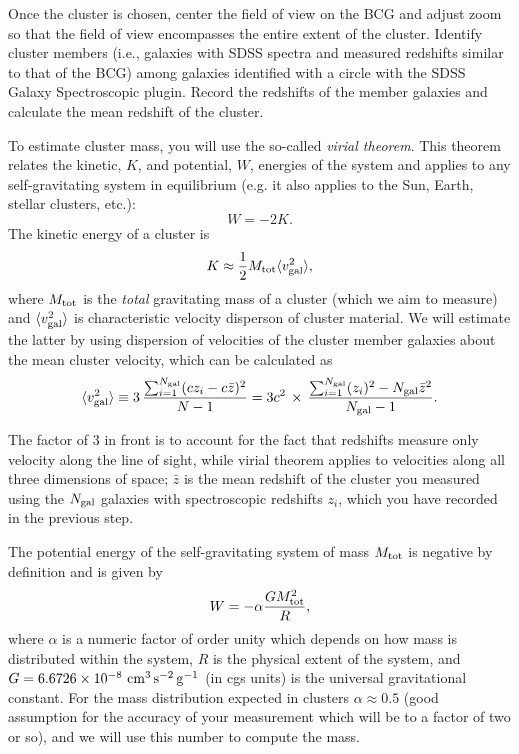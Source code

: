 \documentclass[12pt]{article}
\begin{document}
Once the cluster is chosen, center the field of view on the BCG and adjust zoom so that the field of view
encompasses the entire extent of the cluster. Identify cluster members (i.e., galaxies with SDSS spectra and
measured redshifts similar
to that of the BCG) among galaxies identified with a circle with the SDSS Galaxy Spectroscopic plugin. 
Record the redshifts of the member galaxies and calculate the mean redshift of the cluster. 

To estimate cluster mass, you will use the so-called {\it virial theorem}. This theorem 
relates the kinetic, $K$, and potential, $W$, energies of the system and applies to any self-gravitating system 
in equilibrium (e.g. it also applies to the Sun, Earth, stellar clusters, etc.): 
\begin{equation}
W=-2K.
\label{eq:VT}
\end{equation}
The kinetic energy of a cluster is 
\begin{equation}
K\approx \frac{1}{2}M_{\rm tot}\langle v_{\rm gal}^2 \rangle, 
\label{eq:KE}
\end{equation}
where $M_{\rm tot}$ is the {\it total} gravitating mass of a cluster (which we aim to measure) 
and $\langle v_{\rm gal}^2\rangle$ is characteristic velocity disperson of cluster material. We 
will estimate the latter by using dispersion of velocities of the cluster member galaxies about the 
mean cluster velocity, which can be calculated as
\begin{equation}
\langle v^2_{\rm gal} \rangle \equiv 3\,{\sum_{i=1}^{N_{\rm gal}} (cz_i-c\bar{z})^2\over N-1}= 3c^2\,\times\,{\sum_{i=1}^{N_{\rm gal}} (z_i)^2 - N_{\rm gal}\bar{z}^2\over N_{\rm gal}-1}. 
\label{eq:disp}
\end{equation}

The factor of 3 in front is to account for the fact that redshifts measure only velocity
along the line of sight, while virial theorem applies to velocities along all three dimensions of space; 
$\bar{z}$ is the mean redshift of the cluster you measured using the $N_{\rm gal}$ galaxies with
spectroscopic redshifts $z_i$, which you have recorded in the previous step. 

The potential energy of the self-gravitating system of mass $M_{\rm tot}$ is negative by definition and is given by
\begin{equation}
W=-\alpha \frac{GM_{\rm tot}^2}{R},
\label{eq:PE}
\end{equation}
where $\alpha$ is a numeric factor of order unity which depends on how mass is distributed 
within the system, $R$ is the physical extent of the system, and $G=6.6726\times 10^{-8}\,\,\rm cm^3\, s^{-2}\,g^{-1}$ (in cgs units) is the universal gravitational
constant. For the mass distribution expected in clusters $\alpha\approx 0.5$ (good assumption
for the accuracy of your measurement which will be to a factor of two or so), and 
we will use this number to compute the mass. 
\end{document}

